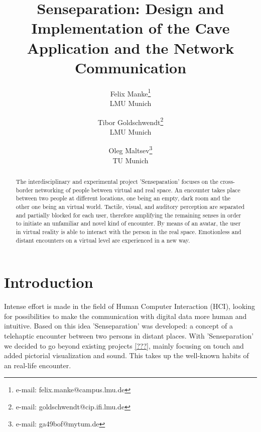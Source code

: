 \documentclass[conference]{acmsiggraph}
\title{Senseparation: Design and Implementation of the Cave Application and the Network Communication}
\author{
	Felix Manke\thanks{e-mail: felix.manke@campus.lmu.de}\\LMU Munich
	\and
	Tibor Goldschwendt\thanks{e-mail: goldschwendt@cip.ifi.lmu.de}\\LMU Munich
	\and
	Oleg Maltsev\thanks{e-mail: ga49bof@mytum.de}\\TU Munich
}
\begin{document}

\maketitle



\begin{abstract}
The interdisciplinary and experimental project 'Senseparation' focuses on the cross-border networking of people between virtual and real space.
An encounter takes place between two people at different locations, one being an empty, dark room and the other one being an virtual world.
Tactile, visual, and auditory perception are separated and partially blocked for each user, therefore amplifying the remaining senses in order to initiate an unfamiliar and novel kind of encounter.
By means of an avatar, the user in virtual reality is able to interact with the person in
the real space. Emotionless and distant encounters on a virtual level are experienced in a new way.
\end{abstract}

\copyrightspace





\section{Introduction}
Intense effort is made in the field of Human Computer Interaction (HCI), looking for possibilities to make the communication with digital data more human and intuitive.
Based on this idea 'Senseparation' was developed: a concept of a telehaptic encounter between two persons in distant places. With 'Senseparation' we decided to go beyond existing projects \ref{???}, 
%
%
mainly focusing on touch and added pictorial visualization and sound. This takes up the well-known habits of an real-life encounter.
\end{document}
